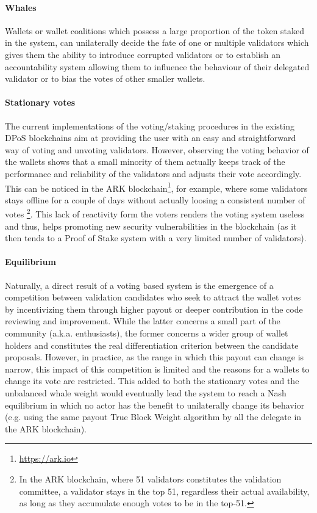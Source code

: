 \documentclass{article}
\begin{document}
\paragraph{Whales} Wallets or wallet coalitions which possess a large proportion of the token staked in the system, can unilaterally decide the fate of one or multiple validators which gives them the ability to introduce corrupted validators or to establish an accountability system allowing them to influence the behaviour of their delegated validator or to bias the votes of other smaller wallets.

\paragraph{Stationary votes}
The current implementations of the voting/staking procedures in the existing DPoS blockchains aim at providing the user with an easy and straightforward way of voting and unvoting validators. However, observing the voting behavior of the wallets shows that a small minority of them actually keeps track of the performance and reliability of the validators and adjusts their vote accordingly. This can be noticed in the ARK blockchain\footnote{\url{https://ark.io}}, for example, where some validators stays offline for a couple of days without actually loosing a consistent number of votes \footnote{In the ARK blockchain, where 51 validators constitutes the validation committee, a validator stays in the top 51, regardless their actual availability, as long as they accumulate enough votes to be in the top-51.}. This lack of reactivity form the voters renders the voting system useless and thus, helps promoting new security vulnerabilities in the blockchain (as it then tends to a Proof of Stake system with a very limited number of validators).

\paragraph{Equilibrium} Naturally, a direct result of a voting based system is the emergence of a competition between validation candidates who seek to attract the wallet votes by incentivizing them through higher payout or deeper contribution in the code reviewing and improvement. While the latter concerns a small part of the community (a.k.a. enthusiasts), the former concerns a wider group of wallet holders and constitutes the real differentiation criterion between the candidate proposals. However, in practice, as the range in which this payout can change is narrow, this impact of this competition is limited and the reasons for a wallets to change its vote are restricted. This added to both the stationary votes and the unbalanced whale weight would eventually lead the system to reach a Nash equilibrium \cite{maskin1999nash} in which no actor has the benefit to unilaterally change its behavior (e.g. using the same payout True Block Weight algorithm by all the delegate in the ARK blockchain).
\end{document}
